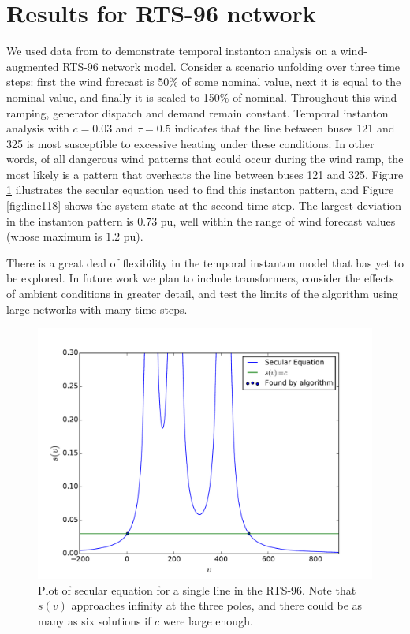 \documentclass[conference]{IEEEtran}
\begin{document}
\section{Results for RTS-96 network}\label{sec:results}

We used data from \cite{pandzic} to demonstrate temporal instanton analysis on a wind-augmented RTS-96 network model. Consider a scenario unfolding over three time steps: first the wind forecast is 50\% of some nominal value, next it is equal to the nominal value, and finally it is scaled to 150\% of nominal. Throughout this wind ramping, generator dispatch and demand remain constant. Temporal instanton analysis with $c=0.03$ and $\tau=0.5$ indicates that the line between buses 121 and 325 is most susceptible to excessive heating under these conditions. In other words, of all dangerous wind patterns that could occur during the wind ramp, the most likely is a pattern that overheats the line between buses 121 and 325. Figure \ref{fig:secular} illustrates the secular equation used to find this instanton pattern, and Figure \ref{fig:line118} shows the system state at the second time step. The largest deviation in the instanton pattern is $0.73$ pu, well within the range of wind forecast values (whose maximum is $1.2$ pu).

There is a great deal of flexibility in the temporal instanton model that has yet to be explored. In future work we plan to include transformers, consider the effects of ambient conditions in greater detail, and test the limits of the algorithm using large networks with many time steps.

\begin{figure}[h]
\centering
\includegraphics[trim=0in 0in 0.5in 0.5in,clip,width=1\linewidth]{../images/secular}
\caption{Plot of secular equation for a single line in the RTS-96. Note that $s(v)$ approaches infinity at the three poles, and there could be as many as six solutions if $c$ were large enough.}
\label{fig:secular}
\end{figure}
\end{document}
